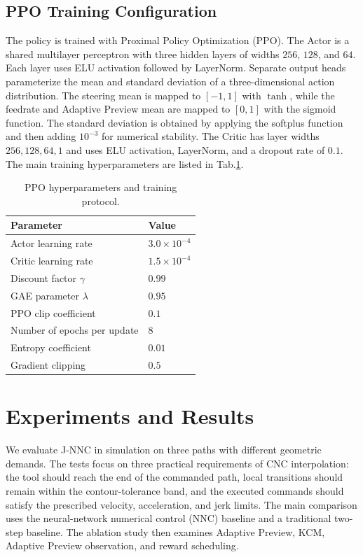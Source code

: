 \documentclass[preprint,12pt]{elsarticle}
\newcommand{\tabref}[1]{Tab.\nobreakspace\ref{#1}}
\begin{document}
\subsection{PPO Training Configuration}
\label{sec:ppo_training_configuration}
The policy is trained with Proximal Policy Optimization (PPO). The Actor is a shared multilayer perceptron with three hidden layers of widths $256$, $128$, and $64$. Each layer uses ELU activation followed by LayerNorm. Separate output heads parameterize the mean and standard deviation of a three-dimensional action distribution. The steering mean is mapped to $[-1,1]$ with $\tanh$, while the feedrate and Adaptive Preview mean are mapped to $[0,1]$ with the sigmoid function. The standard deviation is obtained by applying the softplus function and then adding $10^{-3}$ for numerical stability. The Critic has layer widths $256,128,64,1$ and uses ELU activation, LayerNorm, and a dropout rate of $0.1$. The main training hyperparameters are listed in \tabref{tab:ppo_params}.

\begin{table}[H]
\centering
\caption{PPO hyperparameters and training protocol.}
\label{tab:ppo_params}
\small
\begin{tabular}{lp{}}
\toprule
\textbf{Parameter} & \textbf{Value}\\
\midrule
Actor learning rate & $3.0\times10^{-4}$\\
Critic learning rate & $1.5\times10^{-4}$\\
Discount factor $\gamma$ & $0.99$\\
GAE parameter $\lambda$ & $0.95$\\
PPO clip coefficient & $0.1$\\
Number of epochs per update & $8$\\
Entropy coefficient & $0.01$\\
Gradient clipping & $0.5$\\
\bottomrule
\end{tabular}
\end{table}


\section{Experiments and Results}
\label{sec:experiments_results}

We evaluate J-NNC in simulation on three paths with different geometric demands. The tests focus on three practical requirements of CNC interpolation: the tool should reach the end of the commanded path, local transitions should remain within the contour-tolerance band, and the executed commands should satisfy the prescribed velocity, acceleration, and jerk limits. The main comparison uses the neural-network numerical control (NNC) baseline and a traditional two-step baseline. The ablation study then examines Adaptive Preview, KCM, Adaptive Preview observation, and reward scheduling.
\end{document}
